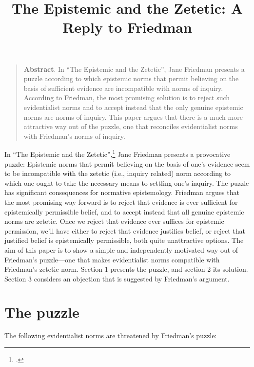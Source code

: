 \documentclass[12pt]{article}
\title{The Epistemic and the Zetetic: A Reply to Friedman}
\date{}
\begin{document}
\maketitle

\begin{quote}
    \textbf{Abstract}.
    In ``The Epistemic and the Zetetic'', Jane Friedman presents a puzzle according to which epistemic norms that permit believing on the basis of sufficient evidence are incompatible with norms of inquiry. According to Friedman, the most promising solution is to reject such evidentialist norms and to accept instead that the only genuine epistemic norms are norms of inquiry. This paper argues that there is a much more attractive way out of the puzzle, one that reconciles evidentialist norms with Friedman's norms of inquiry.
\end{quote}

\noindent In ``The Epistemic and the Zetetic'',\footnote{\textcite{friedman_epistemic_nodate}.} Jane Friedman presents a provocative puzzle: Epistemic norms that permit believing on the basis of one's evidence seem to be incompatible with the zetetic (i.e., inquiry related) norm according to which one ought to take the necessary means to settling one's inquiry. The puzzle has significant consequences for normative epistemology. Friedman argues that the most promising way forward is to reject that evidence is ever sufficient for epistemically permissible belief, and to accept instead that all genuine epistemic norms are zetetic. Once we reject that evidence ever suffices for epistemic permission, we'll have either to reject that evidence justifies belief, or reject that justified belief is epistemically permissible, both quite unattractive options. The aim of this paper is to show a simple and independently motivated way out of Friedman's puzzle---one that makes evidentialist norms compatible with Friedman's zetetic norm. Section 1 presents the puzzle, and section 2 its solution. Section 3 considers an objection that is suggested by Friedman's argument.

\section{The puzzle}\label{sec:puzz}

The following evidentialist norms are threatened by Friedman's puzzle:
\end{document}
